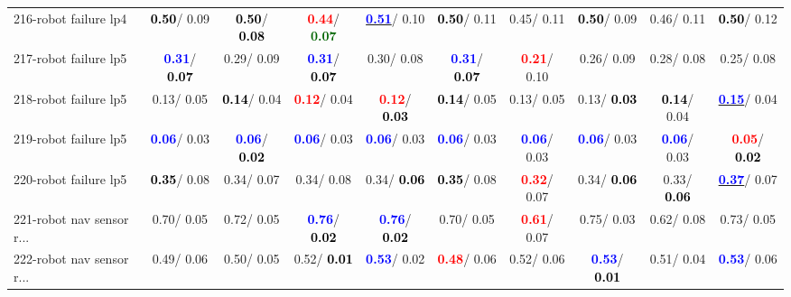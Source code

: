 \begin{table}[h]
\begin{center}
{\begin{tabular}{lc|c|c|c|c|c|c|c|c}
216-robot failure lp4 & \textcolor{black}{\textbf{  0.50}}/  0.09 & \textcolor{black}{\textbf{  0.50}}/\textcolor{black}{\textbf{  0.08}} & \textcolor{red}{\textbf{  0.44}}/\textcolor{darkgreen}{\textbf{  0.07}} & \underline{\textcolor{blue}{\textbf{  0.51}}}/  0.10 & \textcolor{black}{\textbf{  0.50}}/  0.11 &   0.45/  0.11 & \textcolor{black}{\textbf{  0.50}}/  0.09 &   0.46/  0.11 & \textcolor{black}{\textbf{  0.50}}/  0.12 \\
217-robot failure lp5 & \textcolor{blue}{\textbf{  0.31}}/\textcolor{black}{\textbf{  0.07}} &   0.29/  0.09 & \textcolor{blue}{\textbf{  0.31}}/\textcolor{black}{\textbf{  0.07}} &   0.30/  0.08 & \textcolor{blue}{\textbf{  0.31}}/\textcolor{black}{\textbf{  0.07}} & \textcolor{red}{\textbf{  0.21}}/  0.10 &   0.26/  0.09 &   0.28/  0.08 &   0.25/  0.08 \\
218-robot failure lp5 &   0.13/  0.05 & \textcolor{black}{\textbf{  0.14}}/  0.04 & \textcolor{red}{\textbf{  0.12}}/  0.04 & \textcolor{red}{\textbf{  0.12}}/\textcolor{black}{\textbf{  0.03}} & \textcolor{black}{\textbf{  0.14}}/  0.05 &   0.13/  0.05 &   0.13/\textcolor{black}{\textbf{  0.03}} & \textcolor{black}{\textbf{  0.14}}/  0.04 & \underline{\textcolor{blue}{\textbf{  0.15}}}/  0.04 \\
219-robot failure lp5 & \textcolor{blue}{\textbf{  0.06}}/  0.03 & \textcolor{blue}{\textbf{  0.06}}/\textcolor{black}{\textbf{  0.02}} & \textcolor{blue}{\textbf{  0.06}}/  0.03 & \textcolor{blue}{\textbf{  0.06}}/  0.03 & \textcolor{blue}{\textbf{  0.06}}/  0.03 & \textcolor{blue}{\textbf{  0.06}}/  0.03 & \textcolor{blue}{\textbf{  0.06}}/  0.03 & \textcolor{blue}{\textbf{  0.06}}/  0.03 & \textcolor{red}{\textbf{  0.05}}/\textcolor{black}{\textbf{  0.02}} \\
220-robot failure lp5 & \textcolor{black}{\textbf{  0.35}}/  0.08 &   0.34/  0.07 &   0.34/  0.08 &   0.34/\textcolor{black}{\textbf{  0.06}} & \textcolor{black}{\textbf{  0.35}}/  0.08 & \textcolor{red}{\textbf{  0.32}}/  0.07 &   0.34/\textcolor{black}{\textbf{  0.06}} &   0.33/\textcolor{black}{\textbf{  0.06}} & \underline{\textcolor{blue}{\textbf{  0.37}}}/  0.07 \\ \hline
221-robot nav sensor r... &   0.70/  0.05 &   0.72/  0.05 & \textcolor{blue}{\textbf{  0.76}}/\textcolor{black}{\textbf{  0.02}} & \textcolor{blue}{\textbf{  0.76}}/\textcolor{black}{\textbf{  0.02}} &   0.70/  0.05 & \textcolor{red}{\textbf{  0.61}}/  0.07 &   0.75/  0.03 &   0.62/  0.08 &   0.73/  0.05 \\
222-robot nav sensor r... &   0.49/  0.06 &   0.50/  0.05 &   0.52/\textcolor{black}{\textbf{  0.01}} & \textcolor{blue}{\textbf{  0.53}}/  0.02 & \textcolor{red}{\textbf{  0.48}}/  0.06 &   0.52/  0.06 & \textcolor{blue}{\textbf{  0.53}}/\textcolor{black}{\textbf{  0.01}} &   0.51/  0.04 & \textcolor{blue}{\textbf{  0.53}}/  0.06 \\

\end{tabular}}
\end{center}
\end{table}
